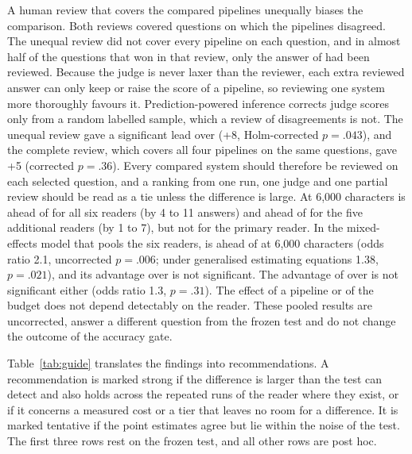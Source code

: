 A human review that covers the compared pipelines unequally biases the comparison. Both reviews covered questions on which the pipelines disagreed. The unequal review did not cover every pipeline on each question, and in almost half of the questions that \lexb{} won in that review, only the answer of \lexb{} had been reviewed. Because the judge is never laxer than the reviewer, each extra reviewed answer can only keep or raise the score of a pipeline, so reviewing one system more thoroughly favours it. Prediction-powered inference \citep{angelopoulos2023ppi} corrects judge scores only from a random labelled sample, which a review of disagreements is not. The unequal review gave \lexb{} a significant lead over \hybrid{} (+8, Holm-corrected $p=.043$), and the complete review, which covers all four pipelines on the same questions, gave +5 (corrected $p=.36$). Every compared system should therefore be reviewed on each selected question, and a ranking from one run, one judge and one partial review should be read as a tie unless the difference is large. %
At 6,000 characters \lexb{} is ahead of \hybrid{} for all six readers (by 4 to 11 answers) and ahead of \hr{} for the five additional readers (by 1 to 7), but not for the primary reader. %
In the mixed-effects model that pools the six readers, \lexb{} is ahead of \hybrid{} at 6,000 characters (odds ratio 2.1, uncorrected $p=.006$; under generalised estimating equations 1.38, $p=.021$), and its advantage over \hr{} is not significant. The advantage of \hr{} over \hybrid{} is not significant either (odds ratio 1.3, $p=.31$). The effect of a pipeline or of the budget does not depend detectably on the reader. These pooled results are uncorrected, answer a different question from the frozen test and do not change the outcome of the accuracy gate.

Table~\ref{tab:guide} translates the findings into recommendations. A recommendation is marked strong if the difference is larger than the test can detect and also holds across the repeated runs of the reader where they exist, or if it concerns a measured cost or a tier that leaves no room for a difference. It is marked tentative if the point estimates agree but lie within the noise of the test. The first three rows rest on the frozen test, and all other rows are post hoc.


